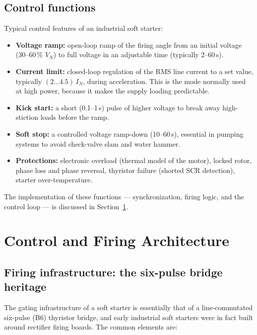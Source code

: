 \subsection{Control functions}

Typical control features of an industrial soft starter:

\begin{itemize}
  \item \textbf{Voltage ramp:} open-loop ramp of the firing angle from an
        initial voltage (30--60\,\% $V_N$) to full voltage in an adjustable
        time (typically 2--60\,\si{\second}).
  \item \textbf{Current limit:} closed-loop regulation of the RMS line
        current to a set value, typically $(2\ldots4.5)\,I_N$, during
        acceleration. This is the mode normally used at high power, because
        it makes the supply loading predictable.
  \item \textbf{Kick start:} a short (0.1--1\,\si{\second}) pulse of higher
        voltage to break away high-stiction loads before the ramp.
  \item \textbf{Soft stop:} a controlled voltage ramp-down (10--60\,\si{\second}),
        essential in pumping systems to avoid check-valve slam and water
        hammer.
  \item \textbf{Protections:} electronic overload (thermal model of the
        motor), locked rotor, phase loss and phase reversal, thyristor
        failure (shorted SCR detection), starter over-temperature.
\end{itemize}

The implementation of these functions --- synchronization, firing logic, and
the control loop --- is discussed in Section~\ref{softstart:sec:control}.

\section{Control and Firing Architecture}
\label{softstart:sec:control}

\subsection{Firing infrastructure: the six-pulse bridge heritage}

The gating infrastructure of a soft starter is essentially that of a
line-commutated six-pulse (B6) thyristor bridge, and early industrial soft
starters were in fact built around rectifier firing boards. The common
elements are:

